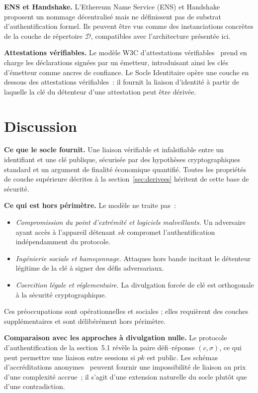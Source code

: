 \documentclass[11pt,a4paper]{article}
\begin{document}
\textbf{ENS et Handshake.}  L'Ethereum Name Service (ENS) et
Handshake~\cite{handshake} proposent un nommage décentralisé mais ne
définissent pas de substrat d'authentification formel.  Ils peuvent être vus
comme des instanciations concrètes de la couche de répertoire $\mathcal{D}$,
compatibles avec l'architecture présentée ici.

\textbf{Attestations vérifiables.}  Le modèle W3C d'attestations
vérifiables~\cite{vc2019} prend en charge les déclarations signées par un
émetteur, introduisant ainsi les clés d'émetteur comme ancres de confiance.
Le Socle Identitaire opère une couche en dessous des attestations vérifiables~:
il fournit la liaison d'identité à partir de laquelle la clé du détenteur
d'une attestation peut être dérivée.

\section{Discussion}
\label{sec:discussion}

\textbf{Ce que le socle fournit.}  Une liaison vérifiable et infalsifiable
entre un identifiant et une clé publique, sécurisée par des hypothèses
cryptographiques standard et un argument de finalité économique quantifié.
Toutes les propriétés de couche supérieure décrites à la
section~\ref{sec:derivees} héritent de cette base de sécurité.

\textbf{Ce qui est hors périmètre.}  Le modèle ne traite pas~:
\begin{itemize}[leftmargin=*]
  \item \emph{Compromission du point d'extrémité et logiciels malveillants.}
    Un adversaire ayant accès à l'appareil détenant $sk$ compromet
    l'authentification indépendamment du protocole.
  \item \emph{Ingénierie sociale et hameçonnage.}  Attaques hors bande
    incitant le détenteur légitime de la clé à signer des défis adversariaux.
  \item \emph{Coercition légale et réglementaire.}  La divulgation forcée de
    clé est orthogonale à la sécurité cryptographique.
\end{itemize}
Ces préoccupations sont opérationnelles et sociales ; elles requièrent des
couches supplémentaires et sont délibérément hors périmètre.

\textbf{Comparaison avec les approches à divulgation nulle.}  Le protocole
d'authentification de la section~5.1 révèle la paire défi--réponse
$(c, \sigma)$, ce qui peut permettre une liaison entre sessions si $pk$ est
public.  Les schémas d'accréditations anonymes~\cite{goldreich2001} peuvent
fournir une impossibilité de liaison au prix d'une complexité accrue~; il
s'agit d'une extension naturelle du socle plutôt que d'une contradiction.
\end{document}
